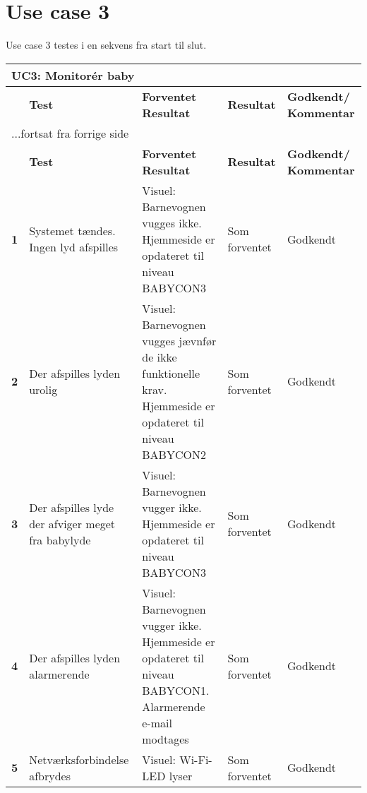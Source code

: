 \section*{Use case 3}

Use case 3 testes i en sekvens fra start til slut.

\begin{center}
	\label{accepttest:uc3} 
\begin{longtable}{|p{}|p{}|p{}|p{}|p{}|} %
\hline
\multicolumn{5}{|l|}{\textbf{UC3: Monitorér baby}} \\ \hline
\multicolumn{1}{|c|}{} &
\textbf{Test} &
\textbf{Forventet \newline Resultat} &
\textbf{Resultat} &
\textbf{Godkendt/ \newline Kommentar} \\ \hline 
\endfirsthead

\multicolumn{5}{l}{...fortsat fra forrige side} \\ \hline 
\multicolumn{1}{|c|}{} &
\textbf{Test} &
\textbf{Forventet \newline Resultat} &
\textbf{Resultat} &
\textbf{Godkendt/ \newline Kommentar} \\ \hline 
\endhead



\textbf{1}	&Systemet tændes. Ingen lyd afspilles
			&Visuel: Barnevognen vugges ikke. 
			 Hjemmeside er opdateret til niveau BABYCON3
			&Som forventet
			& Godkendt
			\\\hline

\textbf{2}	&Der afspilles lyden urolig
			&Visuel: Barnevognen vugges jævnfør de ikke 
			 funktionelle krav. Hjemmeside er opdateret 
			 til niveau BABYCON2
			&Som forventet
			&Godkendt
			\\\hline
			 
\textbf{3}	&Der afspilles lyde der afviger meget fra babylyde
			&Visuel: Barnevognen vugger ikke.
			 Hjemmeside er opdateret til niveau BABYCON3
			&Som forventet
			&Godkendt
			\\\hline			 
			 
\textbf{4}	&Der afspilles lyden alarmerende
			&Visuel: Barnevognen vugger ikke. Hjemmeside 
			 er opdateret til niveau BABYCON1. 
			 Alarmerende e-mail modtages
			&Som forventet
			&Godkendt
			\\\hline

\textbf{5}  &Netværksforbindelse afbrydes
			&Visuel: Wi-Fi-LED lyser
			&Som forventet
			&Godkendt
			\\\hline			
			
\end{longtable}
\end{center}